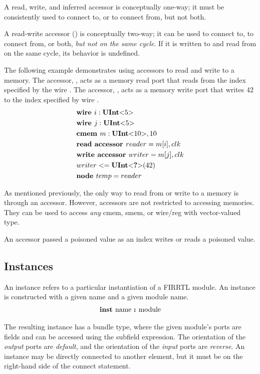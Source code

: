 \documentclass[12pt]{article}
\begin{document}
A read, write, and inferred accessor is conceptually one-way; it must be consistently used to connect to, or to connect from, but not both.

A read-write accessor () is conceptually two-way; it can be used to connect to, to connect from, or both, {\em but not on the same cycle}.
If it is written to and read from on the same cycle, its behavior is undefined.

The following example demonstrates using accessors to read and write to a memory.
The accessor, , acts as a memory read port that reads from the index specified by the wire .
The accessor, , acts as a memory write port that writes 42 to the index specified by wire .
\[
\begin{aligned}
&\text{\bf wire\ } i : \text{\bf UInt}\text{\bf $<$} 5 \text{\bf $>$} \\
&\text{\bf wire\ } j : \text{\bf UInt}\text{\bf $<$} 5 \text{\bf $>$} \\
&\text{\bf cmem\ } m : \text{\bf UInt}\text{\bf $<$} 10 \text{\bf $>$},10 \\
&\text{\bf read\ } \text{\bf accessor\ } reader = m[i] , clk \\
&\text{\bf write\ } \text{\bf accessor\ } writer = m[j] , clk \\
&writer <= \text{\bf UInt}\text{\bf $<$} \text{\bf ?} \text{\bf $>$}(42) \\
&\text{\bf node\ } temp = reader \\
\end{aligned}
\]

As mentioned previously, the only way to read from or write to a memory is through an accessor.
However, accessors are not restricted to accessing memories.
They can be used to access {\em any} cmem, smem, or wire/reg with vector-valued type.

An accessor passed a poisoned value as an index writes or reads a poisoned value.

\subsection{Instances}
An instance refers to a particular instantiation of a FIRRTL module.
An instance is constructed with a given name and a given module name.
\[
\begin{aligned}
\text{\bf inst\ } \text{name } \text{\bf :\ } \text{module}
\end{aligned}
\]

The resulting instance has a bundle type, where the given module's ports are fields and can be accessed using the subfield expression.
The orientation of the {\em output} ports are {\em default}, and the orientation of the {\em input} ports are {\em reverse}.
An instance may be directly connected to another element, but it must be on the right-hand side of the connect statement.
\end{document}
